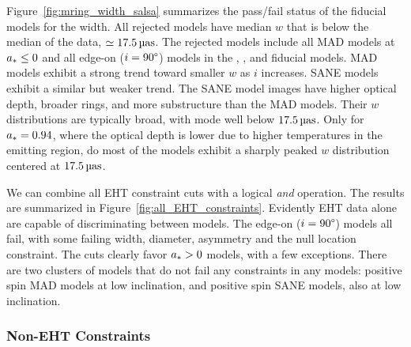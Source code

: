 Figure~\ref{fig:mring_width_salsa} summarizes the pass/fail status of the fiducial models for the \mring width.
All rejected models have median $w$ that is below the median of the data, $ \simeq 17.5\uas$.
The rejected models include all MAD models at $a_* \le 0$ and all edge-on ($i = 90\degree$) models in the \kharma, \bhac, and \hamr fiducial models.
MAD models exhibit a strong trend toward smaller $w$ as $i$ increases.
SANE models exhibit a similar but weaker trend.
The SANE model images have  higher optical depth, broader rings, and more substructure than the MAD models.
Their $w$ distributions are typically broad, with mode well below $17.5\uas$.
Only for $a_* = 0.94$, where the optical depth is lower due to higher temperatures in the emitting region, do most of the models exhibit a sharply peaked $w$ distribution centered at $17.5\uas$.


We can combine all EHT constraint cuts with a logical {\em and} operation.
The results are summarized in Figure~\ref{fig:all_EHT_constraints}.
Evidently EHT data alone are capable of discriminating between models.
The edge-on ($i = 90\degree$) models all fail, with some failing \mring width, diameter, asymmetry and the null location constraint.
The cuts clearly favor $a_* > 0$ models, with a few exceptions.
There are two clusters of models that do not fail any constraints in any models: positive spin MAD models at low inclination, and positive spin SANE models, also at low inclination.

\subsubsection{Non-EHT Constraints}

